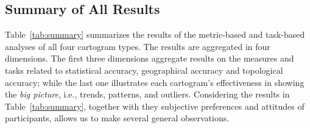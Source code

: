 \documentclass[10pt,journal,compsoc]{IEEEtran}
\begin{document}
\newcommand{\yes}{\textbf{\color{OliveGreen}H}}
\newcommand{\no}{\textbf{\color{red}L}}
\newcommand{\med}{\textbf{\color{YellowOrange}M}}


\subsection{Summary of All Results}

Table~\ref{tab:summary} summarizes the results of the metric-based and task-based analyses of all four cartogram types.
The results are aggregated in four dimensions. The first three dimensions aggregate results on the measures and tasks related to statistical accuracy, geographical accuracy and topological accuracy; while the last one illustrates each cartogram's effectiveness in showing the \textit{big picture}, i.e., trends, patterns, and outliers.
Considering the results in Table~\ref{tab:summary}, together with they subjective preferences and attitudes of participants, allows us to make several general observations.
\end{document}
